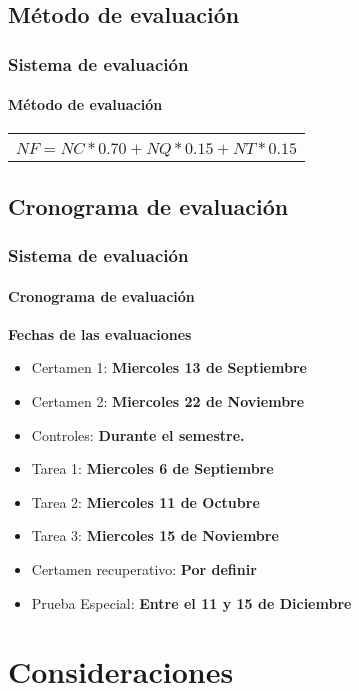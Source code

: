\documentclass{beamer}
\begin{document}
\subsection{M\'etodo de evaluaci\'on}

\begin{frame}
			\frametitle{Sistema de evaluaci\'on}
			\framesubtitle{M\'etodo de evaluaci\'on}
	\begin{block}{}
		\begin{center}
					\begin{tabular}{c}
						\textbf{\color{red}{Notas de certamen}} \\
  							$NF = NC * 0.70 + NQ * 0.15 + NT * 0.15$\\
					\end{tabular}
		\end{center}
	\end{block}
\end{frame}

		\subsection{Cronograma de evaluaci\'on}

		\begin{frame}
			\frametitle{Sistema de evaluaci\'on}
			\framesubtitle{Cronograma de evaluaci\'on}

			\textbf{Fechas de las evaluaciones}

			\begin{itemize}
				\item Certamen 1: \textbf{Miercoles 13 de Septiembre}
				\item Certamen 2: \textbf{Miercoles 22 de Noviembre}
				\item Controles: \textbf{Durante el semestre.}
				\item Tarea 1: \textbf{Miercoles 6 de Septiembre}
				\item Tarea 2: \textbf{Miercoles 11 de Octubre}
				\item Tarea 3: \textbf{Miercoles 15 de Noviembre}
				\item Certamen recuperativo: \textbf{Por definir}
				\item Prueba Especial: \textbf{Entre el 11 y 15 de Diciembre}
			\end{itemize}
		\end{frame}

	\section{Consideraciones}
\end{document}
